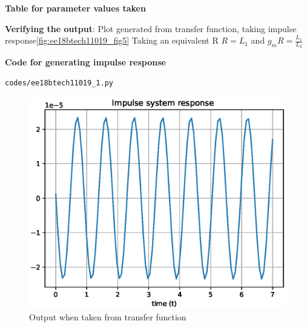 \begin{enumerate}[label=\arabic*.,ref=\theenumi]
\textbf{Table for parameter values taken}
\begin{table}[!ht]
\centering

\caption{}
\label{table:ee18btech11019_1}
\end{table}
\textbf{Verifying the output}:\newline
Plot generated from transfer function, taking impulse response\newline \ref{fig:ee18btech11019_fig5}
Taking an equivalent R  \newline
$R = L_1$ and $g_mR = \frac{L_1}{L_2}$\newline

\textbf{Code for generating impulse response}
\begin{lstlisting}
codes/ee18btech11019_1.py
\end{lstlisting}
\begin{figure}[!ht]
\centering
\includegraphics[width=\columnwidth]{./figs/ee18btech11019_5.eps}
\caption{Output when taken from transfer function}
\label{fig:ee18btech11019_plot_1}
\end{figure}




\end{enumerate}
